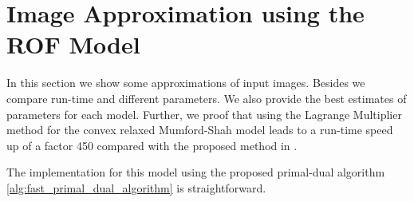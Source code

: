 \section{Image Approximation using the ROF Model} %
\label{sec:image_approximation_using_the_rof_model}
    
    In this section we show some approximations of input images. Besides we compare run-time and different parameters. We also provide the best estimates of parameters for each model. Further, we proof that using the Lagrange Multiplier method for the convex relaxed Mumford-Shah model leads to a run-time speed up of a factor 450 compared with the proposed method in \cite{Pock-et-al-iccv09}.

        

    The implementation for this model using the proposed primal-dual algorithm \ref{alg:fast_primal_dual_algorithm} is straightforward. %

